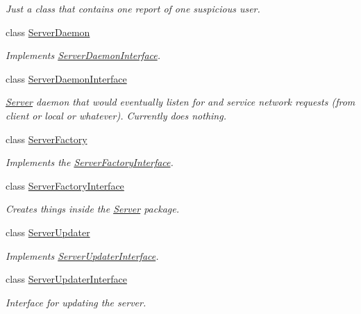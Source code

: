 \begin{DoxyCompactItemize}
\begin{DoxyCompactList}\small\item\em Just a class that contains one report of one suspicious user. \end{DoxyCompactList}\item 
class \hyperlink{classAsteroids_1_1Domain_1_1Server_1_1ServerDaemon}{Server\+Daemon}
\begin{DoxyCompactList}\small\item\em Implements \hyperlink{classAsteroids_1_1Domain_1_1Server_1_1ServerDaemonInterface}{Server\+Daemon\+Interface}. \end{DoxyCompactList}\item 
class \hyperlink{classAsteroids_1_1Domain_1_1Server_1_1ServerDaemonInterface}{Server\+Daemon\+Interface}
\begin{DoxyCompactList}\small\item\em \hyperlink{namespaceAsteroids_1_1Domain_1_1Server}{Server} daemon that would eventually listen for and service network requests (from client or local or whatever). Currently does nothing. \end{DoxyCompactList}\item 
class \hyperlink{classAsteroids_1_1Domain_1_1Server_1_1ServerFactory}{Server\+Factory}
\begin{DoxyCompactList}\small\item\em Implements the \hyperlink{classAsteroids_1_1Domain_1_1Server_1_1ServerFactoryInterface}{Server\+Factory\+Interface}. \end{DoxyCompactList}\item 
class \hyperlink{classAsteroids_1_1Domain_1_1Server_1_1ServerFactoryInterface}{Server\+Factory\+Interface}
\begin{DoxyCompactList}\small\item\em Creates things inside the \hyperlink{namespaceAsteroids_1_1Domain_1_1Server}{Server} package. \end{DoxyCompactList}\item 
class \hyperlink{classAsteroids_1_1Domain_1_1Server_1_1ServerUpdater}{Server\+Updater}
\begin{DoxyCompactList}\small\item\em Implements \hyperlink{classAsteroids_1_1Domain_1_1Server_1_1ServerUpdaterInterface}{Server\+Updater\+Interface}. \end{DoxyCompactList}\item 
class \hyperlink{classAsteroids_1_1Domain_1_1Server_1_1ServerUpdaterInterface}{Server\+Updater\+Interface}
\begin{DoxyCompactList}\small\item\em Interface for updating the server. \end{DoxyCompactList}\end{DoxyCompactItemize}


